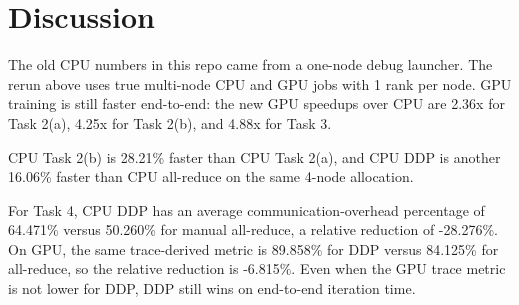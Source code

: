 \documentclass[11pt]{article}
\begin{document}
\section{Discussion}
The old CPU numbers in this repo came from a one-node debug launcher. The rerun above uses true multi-node CPU and GPU jobs with 1 rank per node. GPU training is still faster end-to-end: the new GPU speedups over CPU are 2.36x for Task 2(a), 4.25x for Task 2(b), and 4.88x for Task 3.

CPU Task 2(b) is 28.21\% faster than CPU Task 2(a), and CPU DDP is another 16.06\% faster than CPU all-reduce on the same 4-node allocation.

For Task 4, CPU DDP has an average communication-overhead percentage of 64.471\% versus 50.260\% for manual all-reduce, a relative reduction of -28.276\%. On GPU, the same trace-derived metric is 89.858\% for DDP versus 84.125\% for all-reduce, so the relative reduction is -6.815\%. Even when the GPU trace metric is not lower for DDP, DDP still wins on end-to-end iteration time.
\end{document}
